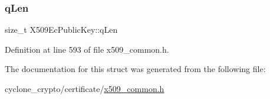 \mbox{\label{structX509EcPublicKey_a62e05abdaa08ec4418a624e44b84a5b8}} 
\subsubsection{\texorpdfstring{q\+Len}{qLen}}
{\footnotesize\ttfamily size\+\_\+t X509\+Ec\+Public\+Key\+::q\+Len}



Definition at line 593 of file x509\+\_\+common.\+h.



The documentation for this struct was generated from the following file\+:\begin{DoxyCompactItemize}
\item 
cyclone\+\_\+crypto/certificate/\hyperlink{certificate_2x509__common_8h}{x509\+\_\+common.\+h}\end{DoxyCompactItemize}
